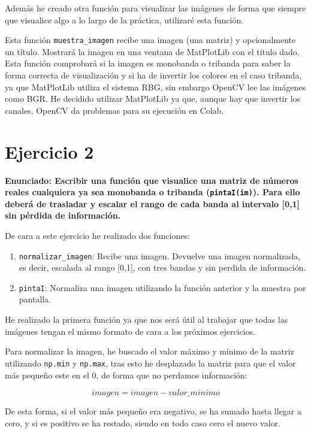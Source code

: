 \documentclass[12pt, spanish]{article}
\begin{document}
Además he creado otra función para visualizar las imágenes de forma que siempre que visualice algo a lo largo de la práctica, utilizaré esta función.

Esta función \texttt{muestra\_imagen} recibe una imagen (una matriz) y opcionalmente un título. Mostrará la imagen en una ventana de MatPlotLib con el titulo dado. Esta función comprobará si la imagen es monobanda o tribanda para saber la forma correcta de visualización y si ha de invertir los colores en el caso tribanda, ya que MatPlotLib utiliza el sistema RBG, sin embargo OpenCV lee las imágenes como BGR\cite{BGR_cv}. He decidido utilizar MatPlotLib ya que, aunque hay que invertir los canales, OpenCV da problemas para su ejecución en Colab.

\section{Ejercicio 2}

\textbf{\large Enunciado: Escribir una función que visualice una matriz de números reales cualquiera ya sea monobanda o tribanda (\texttt{pintaI(im)}). Para ello deberá de trasladar y escalar el rango de cada banda al intervalo [0,1] sin pérdida de información.}

De cara a este ejercicio he realizado dos funciones:

\begin{enumerate}
	\item \texttt{normalizar\_imagen}: Recibe una imagen. Devuelve una imagen normalizada, es decir, escalada al rango [0,1], con tres bandas y sin perdida de información.
	\item \texttt{pintaI}: Normaliza una imagen utilizando la función anterior y la muestra por pantalla.
\end{enumerate}

He realizado la primera función ya que nos será útil al trabajar que todas las imágenes tengan el mismo formato de cara a los próximos ejercicios.

Para normalizar la imagen, he buscado el valor máximo y mínimo de la matriz utilizando \texttt{np.min} y \texttt{np.max}\cite{np_min_max}, tras esto he desplazado la matriz para que el valor más pequeño este en el 0, de forma que no perdamos información:

$$ imagen = imagen - valor\_minimo $$

De esta forma, si el valor más pequeño era negativo, se ha sumado hasta llegar a cero, y si es positivo se ha restado, siendo en todo caso cero el nuevo valor.
\end{document}
